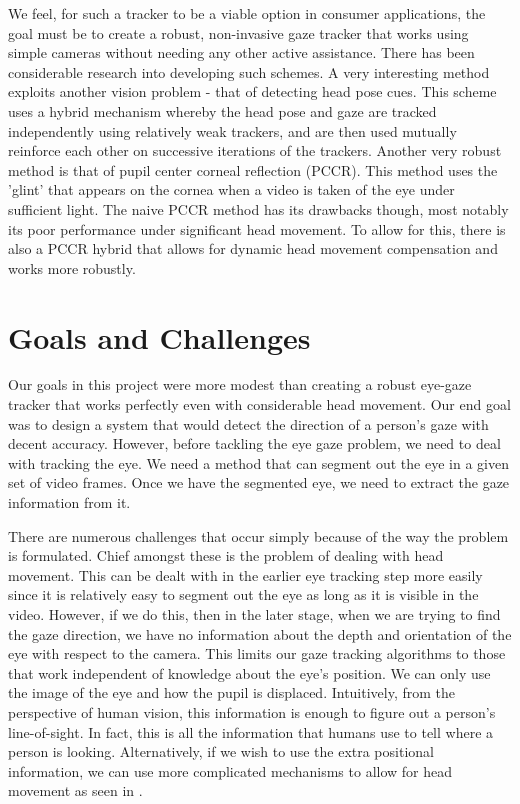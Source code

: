 \documentclass[12pt,letterpaper]{article}
\begin{document}
\begin{multicols}{2}
We feel, for such a tracker to be a viable option in consumer applications, the goal must be to create 
a robust, non-invasive gaze tracker that works using simple cameras without needing any other active
assistance. There has been considerable research into developing such schemes. A very interesting method
exploits another vision problem - that of detecting head pose cues. This scheme uses a hybrid mechanism 
whereby the head pose and gaze are tracked independently using relatively weak trackers, and are then used 
mutually reinforce each other on successive iterations of the trackers\cite{synergetic-tracker}. Another 
very robust method is that of pupil center corneal reflection (PCCR). This method uses the 'glint' that 
appears on the cornea when a video is taken of the eye under sufficient light\cite{pccr-naive}. The naive
PCCR method has its drawbacks though, most notably its poor performance under significant head movement.
To allow for this, there is also a PCCR hybrid that allows for dynamic head movement compensation and 
works more robustly\cite{pccr-dynamic}.


\section{Goals and Challenges}
\label{scn:goals}

Our goals in this project were more modest than creating a robust eye-gaze tracker that works
perfectly even with considerable head movement. Our end goal was to design a system that would detect the
direction of a person's gaze with decent accuracy. However, before tackling the eye gaze problem, we need
to deal with tracking the eye. We need a method that can segment out the eye in a given set of video 
frames. Once we have the segmented eye, we need to extract the gaze information from it. 

There are numerous challenges that occur simply because of the way the problem is formulated. Chief amongst 
these is the problem of dealing with head movement. This can be dealt with in the earlier eye tracking step 
more easily since it is relatively easy to segment out the eye as long as it is visible in the video.
However, if we do this, then in the later stage, when we are trying to find the gaze direction, we have
no information about the depth and orientation of the eye with respect to the camera. This limits our
gaze tracking algorithms to those that work independent of knowledge about the eye's position. We can only
use the image of the eye and how the pupil is displaced. Intuitively, from the perspective of human vision,
this information is enough to figure out a person's line-of-sight. In fact, this is all the information 
that humans use to tell where a person is looking. Alternatively, if we wish to use the extra positional 
information, we can use more complicated mechanisms to allow for head movement as seen in \cite{pccr-dynamic}.


\end{multicols}
\end{document}
